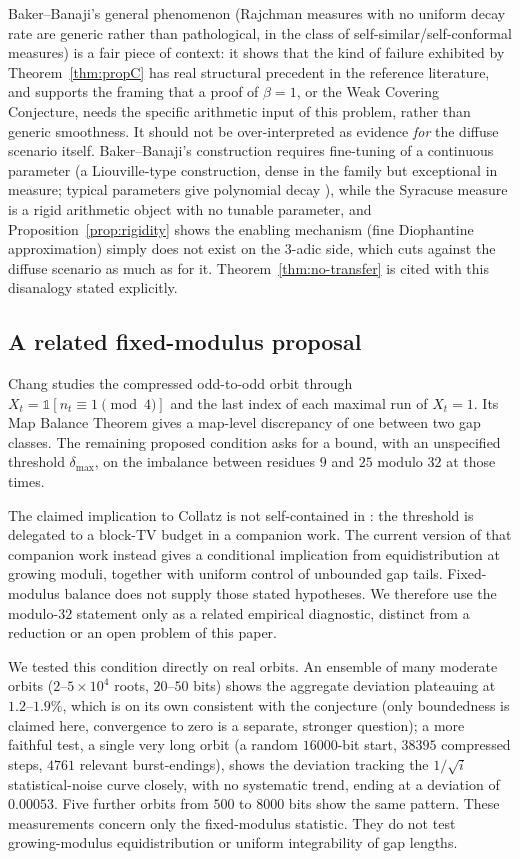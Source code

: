 \documentclass[11pt]{article}
\theoremstyle{definition}
\theoremstyle{remark}
\begin{document}
Baker--Banaji's general phenomenon (Rajchman measures with no uniform
decay rate are generic rather than pathological, in the class of
self-similar/self-conformal measures) is a fair piece of context: it
shows that the kind of failure exhibited by Theorem~\ref{thm:propC}
has real structural precedent in the reference literature, and
supports the framing that a proof of $\beta=1$, or the Weak Covering
Conjecture, needs the specific arithmetic input of this problem,
rather than generic smoothness. It should not be over-interpreted as evidence
\emph{for} the diffuse scenario itself. Baker--Banaji's construction
requires fine-tuning of a continuous parameter (a Liouville-type
construction, dense in the family but exceptional in measure; typical
parameters give polynomial decay \cite{Solomyak1995,VarjuYu2022}),
while the Syracuse measure is a rigid arithmetic object with no
tunable parameter, and Proposition~\ref{prop:rigidity} shows the
enabling mechanism (fine Diophantine approximation) simply does not
exist on the $3$-adic side, which cuts against the diffuse scenario as
much as for it. Theorem~\ref{thm:no-transfer} is cited with this
disanalogy stated explicitly.

\subsection{A related fixed-modulus proposal}

Chang \cite{Chang2026} studies the compressed odd-to-odd orbit through
$X_t=\mathbb{1}[n_t\equiv1\pmod4]$ and the last index of each maximal
run of $X_t=1$. Its Map Balance Theorem gives a map-level discrepancy
of one between two gap classes. The remaining proposed condition asks
for a bound, with an unspecified threshold $\delta_{\max}$, on the
imbalance between residues $9$ and $25$ modulo $32$ at those times.

The claimed implication to Collatz is not self-contained in
\cite{Chang2026}: the threshold is delegated to a block-TV budget in a
companion work. The current version of that companion work
\cite{ChangCompanion2026} instead gives a conditional implication from
equidistribution at growing moduli, together with uniform control of
unbounded gap tails. Fixed-modulus balance does not supply those stated
hypotheses. We therefore use the modulo-$32$ statement only as a related
empirical diagnostic, distinct from a reduction or an open problem of
this paper.

We tested this condition directly on real orbits. An ensemble of many
moderate orbits ($2$--$5\times10^4$ roots, $20$--$50$ bits) shows the
aggregate deviation plateauing at $1.2$--$1.9\%$, which is on its own
consistent with the conjecture (only boundedness is claimed here,
convergence to zero is a separate, stronger question); a more faithful
test, a single very long
orbit (a random $16000$-bit start, $38395$ compressed steps, $4761$
relevant burst-endings), shows the deviation tracking the
$1/\sqrt{i}$ statistical-noise curve closely, with no systematic trend,
ending at a deviation of $0.00053$. Five further orbits from $500$ to
$8000$ bits show the same pattern. These measurements concern only the
fixed-modulus statistic. They do not test growing-modulus
equidistribution or uniform integrability of gap lengths.
\end{document}
